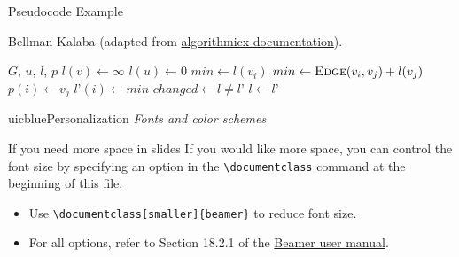 \documentclass{beamer}
\newcommand{\hrefcol}[2]{\textcolor{uihteal}{\href{#1}{#2}}}
\begin{document}
\footlinecolor{}

\begin{frame}[fragile]{Pseudocode Example}
\begin{algorithm}[H]
\fontsize{8}{1}\selectfont
\caption{Bellman-Kalaba (adapted from \hrefcol{https://www.ctan.org/tex-archive/macros/latex/contrib/algorithmicx/algorithmicx.pdf}{algorithmicx documentation}).}
\begin{algorithmic}
\REQUIRE $G$, $u$, $l$, $p$
    \STATE $l(v) \leftarrow \infty$
\ENDFOR
\STATE $l(u) \leftarrow 0$
\REPEAT
        \STATE $min \leftarrow l(v_i)$
                \STATE $min \leftarrow \textsc{Edge}(v_i, v_j) + l(v_j)$ 
                \STATE $p(i) \leftarrow v_j$
            \ENDIF
        \ENDFOR
        \STATE $l’(i) \leftarrow min$
    \ENDFOR
    \STATE $changed \leftarrow l \not= l’$
    \STATE $l \leftarrow l’$
\end{algorithmic}
\end{algorithm}
\end{frame}



\begin{chapter}{uicblue}{Personalization}
\textit{Fonts and color schemes}
\end{chapter}


\begin{frame}[fragile]{If you need more space in slides}
If you would like more space, you can control the font size by specifying an option in the \verb|\documentclass| command at the beginning of this file.
\begin{itemize}
    \item Use \verb|\documentclass[smaller]{beamer}| to reduce font size.
    \item For all options, refer to Section 18.2.1 of the \hrefcol{https://www.ctan.org/tex-archive/macros/latex/contrib/beamer/doc/beameruserguide.pdf}{Beamer user manual}.
\end{itemize}
\end{frame}
\end{document}
